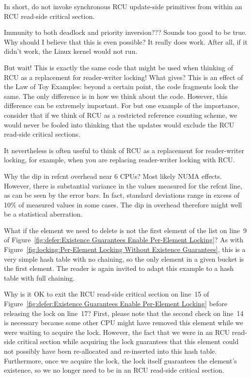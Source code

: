 	In short, do not invoke synchronous RCU update-side primitives
	from within an RCU read-side critical section.

\QuickQ{}
	Immunity to both deadlock and priority inversion???
	Sounds too good to be true.
	Why should I believe that this is even possible?
\QuickA{}
	It really does work.
	After all, if it didn't work, the Linux kernel would not run.

\QuickQ{}
	But wait!
	This is exactly the same code that might be used when thinking
	of RCU as a replacement for reader-writer locking!
	What gives?
\QuickA{}
	This is an effect of the Law of Toy Examples:
	beyond a certain point, the code fragments look the same.
	The only difference is in how we think about the code.
	However, this difference can be extremely important.
	For but one example of the importance, consider that if we think
	of RCU as a restricted reference counting scheme, we would never
	be fooled into thinking that the updates would exclude the RCU
	read-side critical sections.

	It nevertheless is often useful to think of RCU as a replacement
	for reader-writer locking, for example, when you are replacing
	reader-writer locking with RCU.

\QuickQ{}
	Why the dip in refcnt overhead near 6 CPUs?
\QuickA{}
	Most likely NUMA effects.
	However, there is substantial variance in the values measured for the
	refcnt line, as can be seen by the error bars.
	In fact, standard deviations range in excess of 10\% of measured
	values in some cases.
	The dip in overhead therefore might well be a statistical aberration.

\QuickQ{}
	What if the element we need to delete is not the first element
	of the list on line~9 of
	Figure~\ref{fig:defer:Existence Guarantees Enable Per-Element Locking}?
\QuickA{}
	As with
	Figure~\ref{fig:locking:Per-Element Locking Without Existence Guarantees},
	this is a very simple hash table with no chaining, so the only
	element in a given bucket is the first element.
	The reader is again invited to adapt this example to a hash table with
	full chaining.

\QuickQ{}
	Why is it OK to exit the RCU read-side critical section on
	line~15 of
	Figure~\ref{fig:defer:Existence Guarantees Enable Per-Element Locking}
	before releasing the lock on line~17?
\QuickA{}
	First, please note that the second check on line~14 is
	necessary because some other
	CPU might have removed this element while we were waiting
	to acquire the lock.
	However, the fact that we were in an RCU read-side critical section
	while acquiring the lock guarantees that this element could not
	possibly have been re-allocated and re-inserted into this
	hash table.
	Furthermore, once we acquire the lock, the lock itself guarantees
	the element's existence, so we no longer need to be in an
	RCU read-side critical section.

